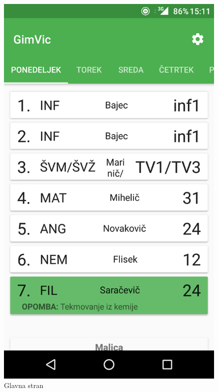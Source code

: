 \begin{figure}[!htb]
  \includegraphics[width=\linewidth]{images/main.png}
  \caption{Glavna stran}\label{fig:main_activity}
\endminipage\hfill
{}

\end{figure}
